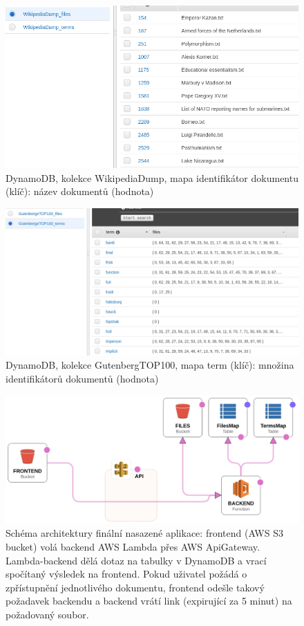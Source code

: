 \documentclass[a4paper,titlepage]{article}
\begin{document}
\begin{figure}[t]
\centering
\includegraphics[scale=0.5]{DynamoDB_table_files_structure.png}
\caption{
DynamoDB, kolekce WikipediaDump,
mapa identifikátor dokumentu (klíč): název dokumentů (hodnota)
}
\end{figure}

\begin{figure}[h]
\centering
\includegraphics[scale=0.4]{DynamoDB_table_terms_structure.png}
\caption{
DynamoDB, kolekce GutenbergTOP100, mapa term (klíč):
množina identifikátorů dokumentů (hodnota)
}
\end{figure}

\begin{figure}[h]
\centering
\includegraphics[scale=0.3]{architecture_scheme.png}
\caption{
Schéma architektury finální nasazené aplikace:
frontend (AWS S3 bucket) volá backend AWS Lambda přes AWS ApiGateway.
Lambda-backend dělá dotaz na tabulky v DynamoDB a vrací spočítaný výsledek na frontend.
Pokud uživatel požádá o zpřístupnění jednotlivého dokumentu, frontend odešle takový
požadavek backendu a backend vrátí link (expirující za 5 minut) na požadovaný soubor.
}
\end{figure}
\end{document}
